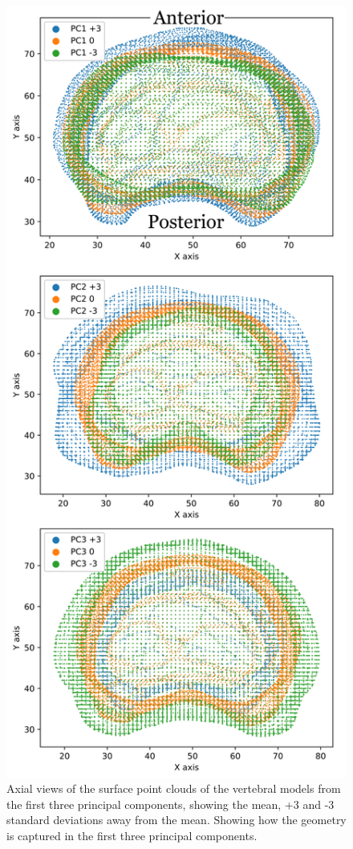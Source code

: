 \begin{figure}[p]
  \centering
  \includegraphics[width=.65\textwidth]{Chapters/Chapter_PCA_images/PC1_2_3_Axial.pdf}
  \caption{Axial views of the surface point clouds of the vertebral models from the first three principal components, showing the mean, +3 and -3 standard deviations away from the mean. Showing how the geometry is captured in the first three principal components.}
  \label{fig:PC1_2_3_Axial}
\end{figure}

